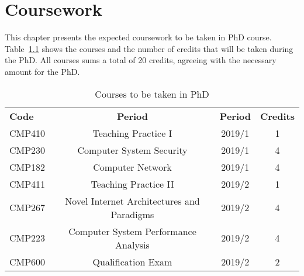 \chapter{Coursework}\label{cap:coursework}
\thispagestyle{empty}

This chapter presents the expected coursework to be taken in PhD course. Table~\ref{tab:phd-courses} shows the courses and the number of credits that will be taken during the PhD. All courses sums a total of 20 credits, agreeing with the necessary amount for the PhD.

\begin{table}[htp]
\centering
\begin{tabularx}{\textwidth}{ l | c | c | c}
\hline
{\bf Code} & {\bf Period} & \textbf{Period} & \textbf{Credits} \\ 
CMP410 & Teaching Practice I & 2019/1 & 1 \\
CMP230 & Computer System Security & 2019/1 & 4 \\
CMP182 & Computer Network & 2019/1 & 4 \\
CMP411 & Teaching Practice II & 2019/2 & 1 \\
CMP267 & Novel Internet Architectures and Paradigms & 2019/2 & 4 \\
CMP223 & Computer System Performance Analysis & 2019/2 & 4 \\
CMP600 & Qualification Exam & 2019/2 & 2 \\

\hline
\end{tabularx}
\caption{Courses to be taken in PhD}
\label{tab:phd-courses}
\end{table}


